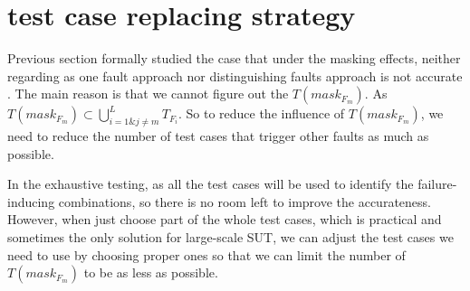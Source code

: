 \documentclass{sig-alternate}
\begin{document}
\section{test case replacing strategy}
Previous section formally studied the case that under the masking effects, neither regarding as one fault approach nor distinguishing faults approach is not accurate . The main reason is that we cannot figure out the $T(mask_{F_{m}})$.  As $T(mask_{F_{m}}) \subset \bigcup_{i = 1 \& j \neq m }^{L}T_{F_{i}}$. So to reduce the influence of $T(mask_{F_{m}})$, we need to reduce the number of test cases that trigger other faults as much as possible.

In the exhaustive testing, as all the test cases will be used to identify the failure-inducing combinations, so there is no room left to improve the accurateness. However, when just choose part of the whole test cases, which is practical and sometimes the only solution for large-scale SUT, we can adjust the test cases we need to use by choosing proper ones so that we can limit the number of $T(mask_{F_{m}})$ to  be as less as possible.



%
%
%
%
\end{document}
